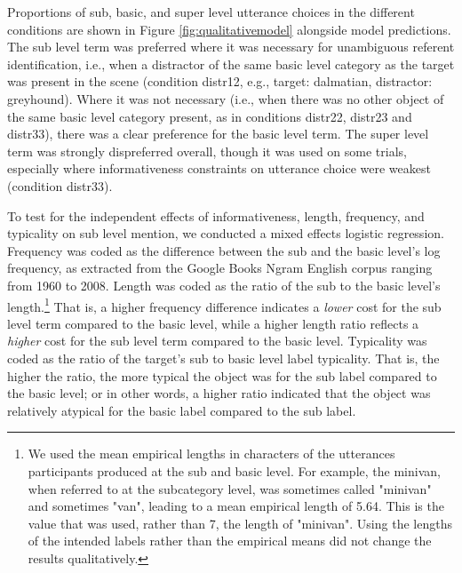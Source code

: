\documentclass[10pt,letterpaper]{article}
\newcommand{\figref}[1]{Figure \ref{#1}}
\begin{document}
Proportions of sub, basic, and super level utterance choices in the different conditions are shown in \figref{fig:qualitativemodel} alongside model predictions. The sub level term was preferred where it was necessary for unambiguous referent identification, i.e., when a distractor of the same basic level category as the target was present in the scene (condition distr12, e.g., target: dalmatian, distractor: greyhound). Where it was not necessary (i.e., when there was no other object of the same basic level category present, as in conditions distr22, distr23 and distr33), there was a clear preference for the basic level term. The super level term was strongly dispreferred overall, though it was used on some trials, especially where informativeness constraints on utterance choice were weakest (condition distr33). 
%

To test for the independent effects of informativeness, length, frequency, and typicality on sub level mention, we conducted a mixed effects logistic regression. Frequency was coded as the difference between the sub and the basic level's log frequency, as extracted from the Google Books Ngram English corpus ranging from 1960 to 2008. Length was coded as the ratio of the sub to the basic level's length.\footnote{We used the mean empirical lengths in characters of the utterances participants produced at the sub and basic level. For example, the minivan, when referred to at the subcategory level, was sometimes called "minivan" and sometimes "van", leading to a mean empirical length of 5.64. This is the value that was used, rather than 7, the length of "minivan". Using the lengths of the intended labels rather than the empirical means did not change the results qualitatively.} That is, a higher frequency difference indicates a \emph{lower} cost for the sub level term compared to the basic level, while a higher length ratio reflects a \emph{higher} cost for the sub level term compared to the basic level. Typicality was coded as the ratio of the target's sub to basic level label typicality. That is, the higher the ratio, the more typical the object was for the sub label compared to the basic level; or in other words, a higher ratio indicated that the object was relatively atypical for the basic label compared to the sub label.
\end{document}
